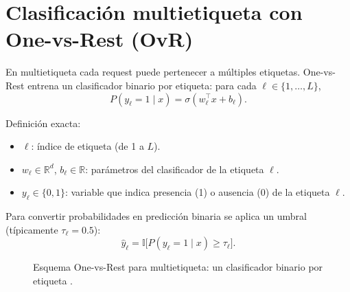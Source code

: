 \documentclass[12pt,oneside]{report}
\newcommand{\R}{\mathbb{R}}
\newcommand{\sigmoid}{\sigma}
\newcommand{\ind}{\mathbb{I}} %
\begin{document}
\section{Clasificación multietiqueta con One-vs-Rest (OvR)}
En multietiqueta cada request puede pertenecer a múltiples etiquetas. One-vs-Rest entrena un clasificador binario por etiqueta:
para cada $\ell \in \{1,\dots,L\}$,
\[
P(y_\ell=1\mid x)=\sigmoid(w_\ell^\top x + b_\ell).
\]

Definición exacta:
\begin{itemize}[leftmargin=*]
  \item $\ell$: índice de etiqueta (de 1 a $L$).
  \item $w_\ell \in \R^d$, $b_\ell \in \R$: parámetros del clasificador de la etiqueta $\ell$.
  \item $y_\ell \in \{0,1\}$: variable que indica presencia (1) o ausencia (0) de la etiqueta $\ell$.
\end{itemize}

Para convertir probabilidades en predicción binaria se aplica un umbral (típicamente $\tau_\ell=0.5$):
\[
\hat{y}_{\ell} = \ind\big[P(y_\ell=1\mid x)\ge \tau_\ell\big].
\]

\begin{figure}[H]
\centering
{}
\caption{Esquema One-vs-Rest para multietiqueta: un clasificador binario por etiqueta \cite{tsoumakas_multilabel_overview,rifkin_ova}.}
\label{fig:ovr}
\end{figure}
\end{document}
